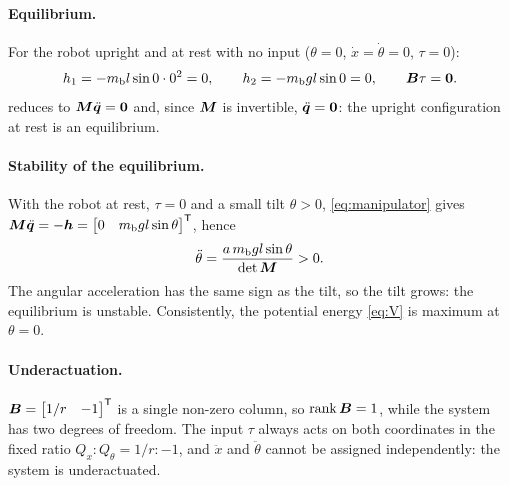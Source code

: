 \paragraph{Equilibrium.}
For the robot upright and at rest with no input ($\theta = 0$,
$\dot x = \dot\theta = 0$, $\tau = 0$):
\begin{equation}
  h_1 = -m_{\mathrm b} l\sin 0\cdot 0^2 = 0, \qquad
  h_2 = -m_{\mathrm b} g l\sin 0 = 0, \qquad
  \bm{B}\tau = \bm 0 .
\end{equation}
 reduces to $\bm{M}\ddot{\bm{q}} = \bm 0$ and, since $\bm{M}$ is
invertible, $\ddot{\bm{q}} = \bm 0$: the upright configuration at rest is an
equilibrium.

\paragraph{Stability of the equilibrium.}
With the robot at rest, $\tau = 0$ and a small tilt $\theta > 0$,
\cref{eq:manipulator} gives
$\bm{M}\ddot{\bm{q}} = -\bm{h} = \begin{bmatrix} 0 & m_{\mathrm b} g l\sin\theta\end{bmatrix}^{\mathsf T}$,
hence
\begin{equation}
  \ddot\theta = \frac{a\,m_{\mathrm b} g l\sin\theta}{\det\bm{M}} > 0 .
\end{equation}
The angular acceleration has the same sign as the tilt, so the tilt grows: the
equilibrium is unstable. Consistently, the potential energy
\cref{eq:V} is maximum at $\theta = 0$.

\paragraph{Underactuation.}
$\bm{B} = \begin{bmatrix} 1/r & -1\end{bmatrix}^{\mathsf T}$ is a single non-zero
column, so $\operatorname{rank}\bm{B} = 1$, while the system has two degrees of
freedom. The input $\tau$ always acts on both coordinates in the fixed ratio
$Q_x : Q_\theta = 1/r : -1$, and $\ddot x$ and $\ddot\theta$ cannot be
assigned independently: the system is underactuated.
